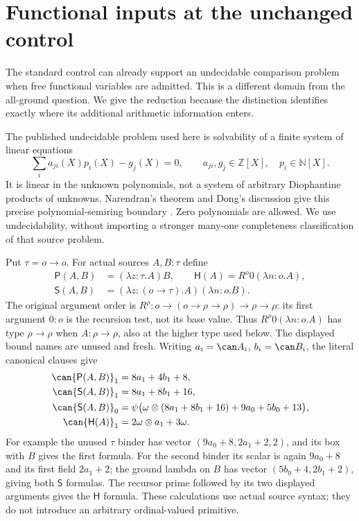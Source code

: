\section{Functional inputs at the unchanged control}\label{sec:functional-hardness}

The standard control can already support an undecidable comparison problem
when free functional variables are admitted.  This is a different domain
from the all-ground question.  We give the reduction because the distinction
identifies exactly where its additional arithmetic information enters.

The published undecidable problem used here is solvability of a finite
system of linear equations
\[
 \sum_i a_{ji}(X)p_i(X)-g_j(X)=0,
 \qquad a_{ji},g_j\in\mathbb Z[X],\quad p_i\in\mathbb N[X].
\]
It is linear in the unknown polynomials, not a system of arbitrary
Diophantine products of unknowns.  Narendran's theorem and Dong's discussion
give this precise polynomial-semiring boundary \cite{narendran,dong}.
Zero polynomials are allowed.  We use undecidability, without importing a
stronger many-one completeness classification of that source problem.

Put $\tau=o\to o$.  For actual sources $A,B:\tau$ define
\begin{align*}
 \mathsf P(A,B)&=(\lambda z:\tau.A)B,\qquad
 \mathsf H(A)=R^o0(\lambda n:o.A),\\
 \mathsf S(A,B)&=(\lambda z:(o\to\tau).A)(\lambda n:o.B).
\end{align*}
The original argument order is
$R^\rho:o\to(o\to\rho\to\rho)\to\rho\to\rho$:
its first argument $0:o$ is the recursion test, not its base value.
Thus $R^\rho0(\lambda n:o.A)$ has type $\rho\to\rho$
when $A:\rho\to\rho$, also at the higher type used below.
The displayed bound names are unused and fresh.  Writing
$a_i=\can A_i$, $b_i=\can B_i$, the literal canonical clauses give
\begin{align*}
 \can{\mathsf P(A,B)}_1&=8a_1+4b_1+8,\\
 \can{\mathsf S(A,B)}_1&=8a_1+8b_1+16,\\
 \can{\mathsf S(A,B)}_0
   &=\psi\bigl(\omega\otimes(8a_1+8b_1+16)+9a_0+5b_0+13\bigr),\\
 \can{\mathsf H(A)}_1&=2\omega\otimes a_1+3\omega.
\end{align*}
For example the unused $\tau$ binder has vector
$(9a_0+8,2a_1+2,2)$, and its box with $B$ gives the first formula.
For the second binder its scalar is again $9a_0+8$ and its first field
$2a_1+2$; the ground lambda on $B$ has vector
$(5b_0+4,2b_1+2)$, giving both $\mathsf S$ formulas.
The recursor prime followed by its two displayed arguments gives
the $\mathsf H$ formula.  These calculations use actual source syntax;
they do not introduce an arbitrary ordinal-valued primitive.

